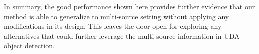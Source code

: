 \documentclass[10pt,twocolumn,letterpaper]{article}
\def\ourda{ViSGA\xspace}
\begin{document}
In summary, the good performance shown here provides further evidence that our method is able to generalize to multi-source setting without applying any modifications in its design.  This  leaves the door open for  exploring any alternatives that could further leverage the multi-source information in UDA object detection. 
\begin{table}
    \centering
    \vspace{1mm}
    \caption{Multi-Source \ourda vs Single-Source \ourda. `Faster': No UDA; `Proposals': UDA with proposal-level alignment; `SG',`MG',`MG+CA': UDA with group-level alignment.}
    \label{tab:eval_source_combined}
    \vspace{0mm}
\end{table}
\end{document}
